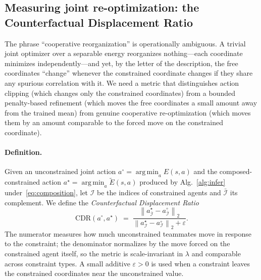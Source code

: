 \documentclass{article}
\begin{document}
\subsection{Measuring joint re-optimization: the Counterfactual Displacement Ratio}
\label{sec:method:cdr}

The phrase ``cooperative reorganization'' is operationally ambiguous. A trivial joint optimizer over a separable energy reorganizes nothing---each coordinate minimizes independently---and yet, by the letter of the description, the free coordinates ``change'' whenever the constrained coordinate changes if they share any spurious correlation with it. We need a metric that distinguishes action clipping (which changes only the constrained coordinates) from a bounded penalty-based refinement (which moves the free coordinates a small amount away from the trained mean) from genuine cooperative re-optimization (which moves them by an amount comparable to the forced move on the constrained coordinate).

\paragraph{Definition.}
Given an unconstrained joint action $a^\circ = \operatorname*{arg\,min}_a E(s, a)$ and the composed-constrained action $a^\star = \operatorname*{arg\,min}_a \widetilde E(s, a)$ produced by Alg.~\ref{alg:infer} under~\eqref{eq:composition}, let $\mathcal{I}$ be the indices of constrained agents and $\bar{\mathcal{I}}$ its complement. We define the \emph{Counterfactual Displacement Ratio}
\begin{equation}
\mathrm{CDR}\!\left(a^\circ, a^\star\right) \;=\; \frac{\left\lVert a^\star_{\bar{\mathcal{I}}} - a^\circ_{\bar{\mathcal{I}}} \right\rVert_2}{\left\lVert a^\star_{\mathcal{I}} - a^\circ_{\mathcal{I}} \right\rVert_2 + \varepsilon}.
\label{eq:cdr}
\end{equation}
The numerator measures how much unconstrained teammates move in response to the constraint; the denominator normalizes by the move forced on the constrained agent itself, so the metric is scale-invariant in $\lambda$ and comparable across constraint types. A small additive $\varepsilon > 0$ is used when a constraint leaves the constrained coordinates near the unconstrained value.
\end{document}
